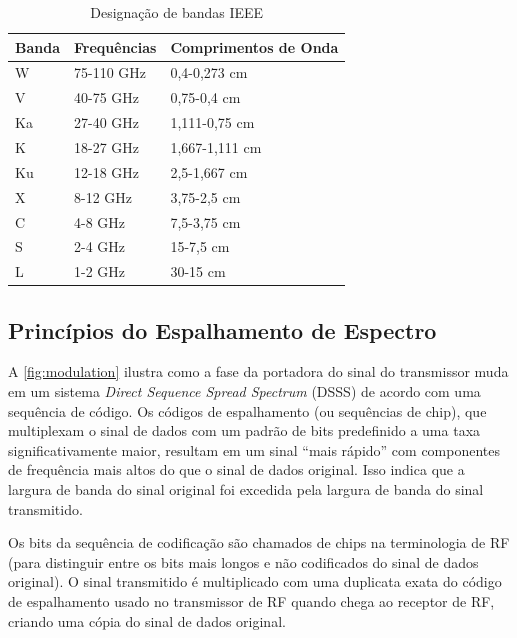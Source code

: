 \documentclass[
	12pt,				%
	openright,			%
	twoside,			%
	a4paper,			%
	english,			%
	french,				%
	spanish,			%
	brazil				%
	]{abntex2}
\newcommand{\quotes}[1]{``#1''}
\begin{document}
\begin{table}[H]
\centering
\caption{Designação de bandas IEEE}
\label{tab:radio_ieee}
\begin{tabular}{|l|l|l|} 
\hline
\textbf{Banda} & \textbf{Frequências} & \textbf{Comprimentos de Onda}  \\ 
\hline
W              & 75-110 GHz           & 0,4-0,273 cm                   \\
V              & 40-75 GHz            & 0,75-0,4 cm                    \\
Ka             & 27-40 GHz            & 1,111-0,75 cm                  \\
K              & 18-27 GHz            & 1,667-1,111 cm                 \\
Ku             & 12-18 GHz            & 2,5-1,667 cm                   \\
X              & 8-12 GHz             & 3,75-2,5 cm                    \\
C              & 4-8 GHz              & 7,5-3,75 cm                    \\
S              & 2-4 GHz              & 15-7,5 cm                      \\
L              & 1-2 GHz              & 30-15 cm                       \\
\hline
\end{tabular}
\end{table}

\subsection{Princípios do Espalhamento de Espectro}

A \autoref{fig:modulation} ilustra como a fase da portadora do sinal do transmissor muda em um sistema \emph{Direct Sequence Spread Spectrum} (DSSS) de acordo com uma sequência de código. Os códigos de espalhamento (ou sequências de chip), que multiplexam o sinal de dados com um padrão de bits predefinido a uma taxa significativamente maior, resultam em um sinal \quotes{mais rápido} com componentes de frequência mais altos do que o sinal de dados original. Isso indica que a largura de banda do sinal original foi excedida pela largura de banda do sinal transmitido.

Os bits da sequência de codificação são chamados de chips na terminologia de RF (para distinguir entre os bits mais longos e não codificados do sinal de dados original). O sinal transmitido é multiplicado com uma duplicata exata do código de espalhamento usado no transmissor de RF quando chega ao receptor de RF, criando uma cópia do sinal de dados original.
\end{document}
